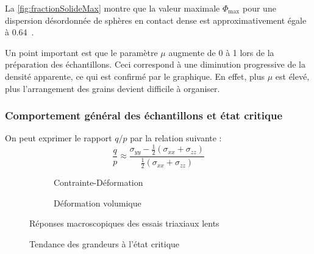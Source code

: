 \documentclass[a4paper,12pt]{report}
\begin{document}
La \autoref{fig:fractionSolideMax} montre que la valeur maximale $\Phi_{\max}$ pour une dispersion désordonnée de sphères en contact dense est approximativement égale à 0.64~\citep{combe2023demlecture}.  

Un point important est que le paramètre $\mu$ augmente de 0 à 1 lors de la préparation des échantillons. Ceci correspond à une diminution progressive de la densité apparente, ce qui est confirmé par le graphique. En effet, plus $\mu$ est élevé, plus l’arrangement des grains devient difficile à organiser.

\subsubsection{Comportement général des échantillons et état critique}

On peut exprimer le rapport $q/p$ par la relation suivante :
\begin{equation}
\frac{q}{p} \approx \frac{\sigma_{yy} - \frac{1}{2}(\sigma_{xx} + \sigma_{zz})}{\frac{1}{2}(\sigma_{xx} + \sigma_{zz})}
\label{eq:qformulation}
\end{equation}

\begin{figure}[htbp]
    \centering
    \begin{subfigure}[b]{0.49\textwidth}
        \centering
        \small
        \scalebox{0.5}{}
        \caption{Contrainte-Déformation}
        \label{fig:contrainte}
    \end{subfigure}
    \hfill
    \begin{subfigure}[b]{0.49\textwidth}
        \centering
        \small
        \scalebox{0.5}{}
        \caption{Déformation volumique}
        \label{fig:defvo}
    \end{subfigure}
    \caption{Réponses macroscopiques des essais triaxiaux lents}
    \label{fig:comparaison}
\end{figure}

\begin{figure}[h!]
    \centering
    \caption{Tendance des grandeurs à l’état critique}
    \label{fig:Palier}
\end{figure}
\end{document}
